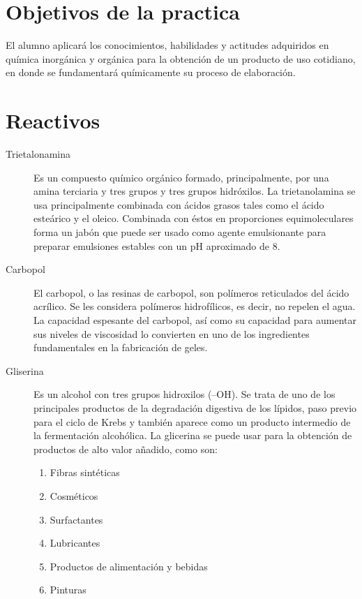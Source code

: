 \documentclass[12pt]{article}
\begin{document}
\section{Objetivos de la practica}
	El alumno aplicará los conocimientos, habilidades y actitudes adquiridos en química inorgánica y orgánica para la obtención de un producto de uso cotidiano, en donde se fundamentará químicamente su proceso de elaboración.
\section{Reactivos}
\begin{description}
	\item[Trietalonamina] Es un compuesto químico orgánico formado, principalmente, por una amina terciaria y tres grupos y tres grupos hidróxilos. La trietanolamina se usa principalmente combinada con ácidos grasos tales como el ácido esteárico y el oleico. Combinada con éstos en proporciones equimoleculares forma un jabón que puede ser usado como agente emulsionante para preparar emulsiones estables con un pH aproximado de 8.
	\item[Carbopol] El carbopol, o las resinas de carbopol, son polímeros reticulados del ácido acrílico. Se les considera polímeros hidrofílicos, es decir, no repelen el agua. La capacidad espesante del carbopol, así como su capacidad para aumentar sus niveles de viscosidad lo convierten en uno de los ingredientes fundamentales en la fabricación de geles.
	\item[Gliserina] Es un alcohol con tres grupos hidroxilos (–OH). Se trata de uno de los principales productos de la degradación digestiva de los lípidos, paso previo para el ciclo de Krebs y también aparece como un producto intermedio de la fermentación alcohólica. La glicerina se puede usar para la obtención de productos de alto valor añadido, como son:
	\begin{enumerate}
		\item Fibras sintéticas
		\item Cosméticos
		\item Surfactantes
		\item Lubricantes
		\item Productos de alimentación y bebidas
		\item Pinturas
	\end{enumerate}

\end{description}
\end{document}
